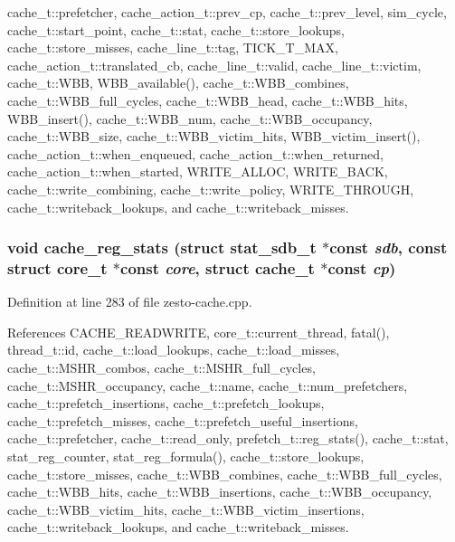 cache\_\-t::prefetcher, cache\_\-action\_\-t::prev\_\-cp, cache\_\-t::prev\_\-level, sim\_\-cycle, cache\_\-t::start\_\-point, cache\_\-t::stat, cache\_\-t::store\_\-lookups, cache\_\-t::store\_\-misses, cache\_\-line\_\-t::tag, TICK\_\-T\_\-MAX, cache\_\-action\_\-t::translated\_\-cb, cache\_\-line\_\-t::valid, cache\_\-line\_\-t::victim, cache\_\-t::WBB, WBB\_\-available(), cache\_\-t::WBB\_\-combines, cache\_\-t::WBB\_\-full\_\-cycles, cache\_\-t::WBB\_\-head, cache\_\-t::WBB\_\-hits, WBB\_\-insert(), cache\_\-t::WBB\_\-num, cache\_\-t::WBB\_\-occupancy, cache\_\-t::WBB\_\-size, cache\_\-t::WBB\_\-victim\_\-hits, WBB\_\-victim\_\-insert(), cache\_\-action\_\-t::when\_\-enqueued, cache\_\-action\_\-t::when\_\-returned, cache\_\-action\_\-t::when\_\-started, WRITE\_\-ALLOC, WRITE\_\-BACK, cache\_\-t::write\_\-combining, cache\_\-t::write\_\-policy, WRITE\_\-THROUGH, cache\_\-t::writeback\_\-lookups, and cache\_\-t::writeback\_\-misses.
\subsubsection[{cache\_\-reg\_\-stats}]{\setlength{\rightskip}{0pt plus 5cm}void cache\_\-reg\_\-stats (struct {\bf stat\_\-sdb\_\-t} $\ast$const  {\em sdb}, \/  const struct {\bf core\_\-t} $\ast$const  {\em core}, \/  struct {\bf cache\_\-t} $\ast$const  {\em cp})}\label{zesto-cache_8cpp_80141f1bc8f06e0805162cdd6936c5d8}




Definition at line 283 of file zesto-cache.cpp.

References CACHE\_\-READWRITE, core\_\-t::current\_\-thread, fatal(), thread\_\-t::id, cache\_\-t::load\_\-lookups, cache\_\-t::load\_\-misses, cache\_\-t::MSHR\_\-combos, cache\_\-t::MSHR\_\-full\_\-cycles, cache\_\-t::MSHR\_\-occupancy, cache\_\-t::name, cache\_\-t::num\_\-prefetchers, cache\_\-t::prefetch\_\-insertions, cache\_\-t::prefetch\_\-lookups, cache\_\-t::prefetch\_\-misses, cache\_\-t::prefetch\_\-useful\_\-insertions, cache\_\-t::prefetcher, cache\_\-t::read\_\-only, prefetch\_\-t::reg\_\-stats(), cache\_\-t::stat, stat\_\-reg\_\-counter, stat\_\-reg\_\-formula(), cache\_\-t::store\_\-lookups, cache\_\-t::store\_\-misses, cache\_\-t::WBB\_\-combines, cache\_\-t::WBB\_\-full\_\-cycles, cache\_\-t::WBB\_\-hits, cache\_\-t::WBB\_\-insertions, cache\_\-t::WBB\_\-occupancy, cache\_\-t::WBB\_\-victim\_\-hits, cache\_\-t::WBB\_\-victim\_\-insertions, cache\_\-t::writeback\_\-lookups, and cache\_\-t::writeback\_\-misses.
